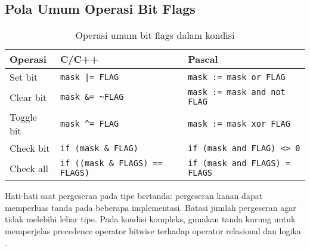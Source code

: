 \documentclass[../main.tex]{subfiles}
\begin{document}
\subsection{Pola Umum Operasi Bit Flags}
\begin{table}[H]
  \centering
  \caption{Operasi umum bit flags dalam kondisi}
  \begin{tabular}{@{}lll@{}}
    \toprule
    Operasi & C/C++ & Pascal \\
    \midrule
    Set bit & \texttt{mask |= FLAG} & \texttt{mask := mask or FLAG} \\
    Clear bit & \texttt{mask \&= \~{}FLAG} & \texttt{mask := mask and not FLAG} \\
    Toggle bit & \texttt{mask \^{}= FLAG} & \texttt{mask := mask xor FLAG} \\
    Check bit & \texttt{if (mask \& FLAG)} & \texttt{if (mask and FLAG) {\textless}{\textgreater} 0} \\
    Check all & \texttt{if ((mask \& FLAGS) == FLAGS)} & \texttt{if (mask and FLAGS) = FLAGS} \\
    \bottomrule
  \end{tabular}
\end{table}

Hati-hati saat pergeseran pada tipe bertanda: pergeseran kanan dapat memperluas tanda pada beberapa implementasi. Batasi jumlah pergeseran agar tidak melebihi lebar tipe. Pada kondisi kompleks, gunakan tanda kurung untuk memperjelas precedence operator bitwise terhadap operator relasional dan logika \parencite{iso-c-draft-n1570,cpp-reference}.
\end{document}
